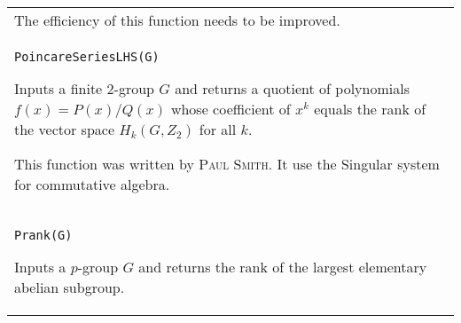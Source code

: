\documentclass[a4paper,11pt]{report}
\begin{document}
{\begin{center}
\begin{tabular}{|l|}
 The efficiency of this function needs to be improved. \\
 \texttt{PoincareSeriesLHS(G) } 

 Inputs a finite $2$-group $G$ and returns a quotient of polynomials $f(x)=P(x)/Q(x)$ whose coefficient of $x^k$ equals the rank of the vector space $H_k(G,Z_2)$ for all $k$. 

 This function was written by \textsc{Paul Smith}. It use the Singular system for commutative algebra. \\
 \index{Prank} \texttt{Prank(G) } 

 Inputs a $p$-group $G$ and returns the rank of the largest elementary abelian subgroup. \\
\end{tabular}\\[2mm]
\end{center}

 }

 
\end{document}

